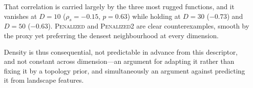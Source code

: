 That correlation is carried largely by the three most rugged
functions, and it vanishes at $D=10$ ($\rho_{s}=-0.15$, $p=0.63$) while holding
at $D=30$ ($-0.73$) and $D=50$ ($-0.63$). \textsc{Penalized} and
\textsc{Penalized2} are clear counterexamples, smooth by the proxy yet
preferring the densest neighbourhood at every dimension.

Density is thus consequential, not predictable in advance from this
descriptor, and not constant across dimension---an argument for adapting it
rather than fixing it by a topology prior, and simultaneously an argument
against predicting it from landscape features.
